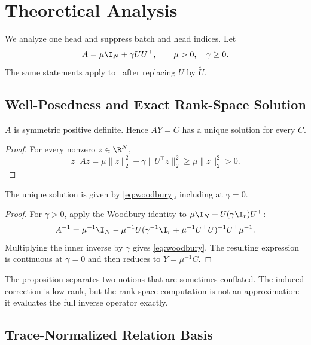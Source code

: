 \section{Theoretical Analysis}
\label{sec:theory}

We analyze one head and suppress batch and head indices. Let
\begin{equation}
  A=\mu\I_N+\gamma UU^\top,
  \qquad \mu>0,\quad\gamma\geq0.
\end{equation}
The same statements apply to \RRLSSO\ after replacing $U$ by $\widetilde U$.

\subsection{Well-Posedness and Exact Rank-Space Solution}

\begin{proposition}
\label{prop:spd}
$A$ is symmetric positive definite. Hence $AY=C$ has a unique solution for every $C$.
\end{proposition}
\begin{proof}
For every nonzero $z\in\R^N$,
\[
  z^\top Az
  =\mu\lVert z\rVert_2^2
  +\gamma\lVert U^\top z\rVert_2^2
  \geq\mu\lVert z\rVert_2^2>0.
\]
\end{proof}

\begin{proposition}
\label{prop:woodbury}
The unique solution is given by \cref{eq:woodbury}, including at $\gamma=0$.
\end{proposition}
\begin{proof}
For $\gamma>0$, apply the Woodbury identity to $\mu\I_N+U(\gamma\I_r)U^\top$:
\[
  A^{-1}
  =\mu^{-1}\I_N
  -\mu^{-1}U
  (\gamma^{-1}\I_r+\mu^{-1}U^\top U)^{-1}
  U^\top\mu^{-1}.
\]
Multiplying the inner inverse by $\gamma$ gives \cref{eq:woodbury}. The resulting expression is continuous at $\gamma=0$ and then reduces to $Y=\mu^{-1}C$.
\end{proof}

The proposition separates two notions that are sometimes conflated. The induced correction is low-rank, but the rank-space computation is not an approximation: it evaluates the full inverse operator exactly.

\subsection{Trace-Normalized Relation Basis}

